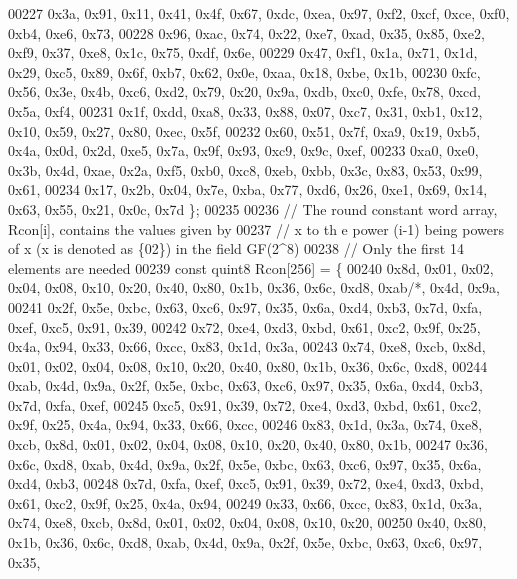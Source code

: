 \begin{DoxyCode}
00227       0x3a, 0x91, 0x11, 0x41, 0x4f, 0x67, 0xdc, 0xea, 0x97, 0xf2, 0xcf, 0xce, 0xf0, 0xb4, 0xe6, 0x73,
00228       0x96, 0xac, 0x74, 0x22, 0xe7, 0xad, 0x35, 0x85, 0xe2, 0xf9, 0x37, 0xe8, 0x1c, 0x75, 0xdf, 0x6e,
00229       0x47, 0xf1, 0x1a, 0x71, 0x1d, 0x29, 0xc5, 0x89, 0x6f, 0xb7, 0x62, 0x0e, 0xaa, 0x18, 0xbe, 0x1b,
00230       0xfc, 0x56, 0x3e, 0x4b, 0xc6, 0xd2, 0x79, 0x20, 0x9a, 0xdb, 0xc0, 0xfe, 0x78, 0xcd, 0x5a, 0xf4,
00231       0x1f, 0xdd, 0xa8, 0x33, 0x88, 0x07, 0xc7, 0x31, 0xb1, 0x12, 0x10, 0x59, 0x27, 0x80, 0xec, 0x5f,
00232       0x60, 0x51, 0x7f, 0xa9, 0x19, 0xb5, 0x4a, 0x0d, 0x2d, 0xe5, 0x7a, 0x9f, 0x93, 0xc9, 0x9c, 0xef,
00233       0xa0, 0xe0, 0x3b, 0x4d, 0xae, 0x2a, 0xf5, 0xb0, 0xc8, 0xeb, 0xbb, 0x3c, 0x83, 0x53, 0x99, 0x61,
00234       0x17, 0x2b, 0x04, 0x7e, 0xba, 0x77, 0xd6, 0x26, 0xe1, 0x69, 0x14, 0x63, 0x55, 0x21, 0x0c, 0x7d \};
00235 
00236     \textcolor{comment}{// The round constant word array, Rcon[i], contains the values given by}
00237     \textcolor{comment}{// x to th e power (i-1) being powers of x (x is denoted as \{02\}) in the field GF(2^8)}
00238     \textcolor{comment}{// Only the first 14 elements are needed}
00239     \textcolor{keyword}{const} quint8 Rcon[256] = \{
00240         0x8d, 0x01, 0x02, 0x04, 0x08, 0x10, 0x20, 0x40, 0x80, 0x1b, 0x36, 0x6c, 0xd8, 0xab\textcolor{comment}{/*, 0x4d, 0x9a,}
00241 \textcolor{comment}{        0x2f, 0x5e, 0xbc, 0x63, 0xc6, 0x97, 0x35, 0x6a, 0xd4, 0xb3, 0x7d, 0xfa, 0xef, 0xc5, 0x91, 0x39,}
00242 \textcolor{comment}{        0x72, 0xe4, 0xd3, 0xbd, 0x61, 0xc2, 0x9f, 0x25, 0x4a, 0x94, 0x33, 0x66, 0xcc, 0x83, 0x1d, 0x3a,}
00243 \textcolor{comment}{        0x74, 0xe8, 0xcb, 0x8d, 0x01, 0x02, 0x04, 0x08, 0x10, 0x20, 0x40, 0x80, 0x1b, 0x36, 0x6c, 0xd8,}
00244 \textcolor{comment}{        0xab, 0x4d, 0x9a, 0x2f, 0x5e, 0xbc, 0x63, 0xc6, 0x97, 0x35, 0x6a, 0xd4, 0xb3, 0x7d, 0xfa, 0xef,}
00245 \textcolor{comment}{        0xc5, 0x91, 0x39, 0x72, 0xe4, 0xd3, 0xbd, 0x61, 0xc2, 0x9f, 0x25, 0x4a, 0x94, 0x33, 0x66, 0xcc,}
00246 \textcolor{comment}{        0x83, 0x1d, 0x3a, 0x74, 0xe8, 0xcb, 0x8d, 0x01, 0x02, 0x04, 0x08, 0x10, 0x20, 0x40, 0x80, 0x1b,}
00247 \textcolor{comment}{        0x36, 0x6c, 0xd8, 0xab, 0x4d, 0x9a, 0x2f, 0x5e, 0xbc, 0x63, 0xc6, 0x97, 0x35, 0x6a, 0xd4, 0xb3,}
00248 \textcolor{comment}{        0x7d, 0xfa, 0xef, 0xc5, 0x91, 0x39, 0x72, 0xe4, 0xd3, 0xbd, 0x61, 0xc2, 0x9f, 0x25, 0x4a, 0x94,}
00249 \textcolor{comment}{        0x33, 0x66, 0xcc, 0x83, 0x1d, 0x3a, 0x74, 0xe8, 0xcb, 0x8d, 0x01, 0x02, 0x04, 0x08, 0x10, 0x20,}
00250 \textcolor{comment}{        0x40, 0x80, 0x1b, 0x36, 0x6c, 0xd8, 0xab, 0x4d, 0x9a, 0x2f, 0x5e, 0xbc, 0x63, 0xc6, 0x97, 0x35,}

\end{DoxyCode}
